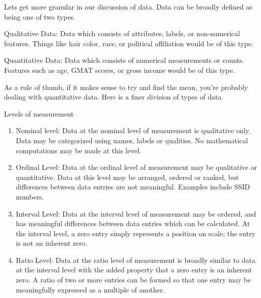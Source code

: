 Lets get more granular in our discussion of data. Data can be broadly defined as being one of two types.

\begin{definition}
Qualitative Data: Data which consists of attributes, labels, or non-numerical features. Things like hair color, race, or political affiliation would be of this type.
\end{definition} 

\begin{definition}
Quantitative Data: Data which consists of numerical measurements or counts. Features such as age, GMAT scores, or gross income would be of this type.
\end{definition} 

As a rule of thumb, if it makes sense to try and find the mean, you're probably dealing with quantitative data. Here is a finer division of types of data.

\begin{theorem}Levels of measurement\newline
\begin{enumerate}

\item Nominal level: Data at the nominal level of measurement is qualitative only. Data may be categorized using names, labels or qualities. No mathematical computations may be made at this level.

\item Ordinal Level: Data at the ordinal level of measurement may be qualitative or quantitative. Data at this level may be arranged, ordered or ranked, but differences between data entries are not meaningful. Examples include SSID numbers.

\item Interval Level: Data at the interval level of measurement may be ordered, and has meaningful differences between data entries which can be calculated. At the interval level, a zero entry simply represents a position on scale; the entry is not an inherent zero.

\item Ratio Level: Data at the ratio level of measurement is broadly similar to data at the interval level with the added property that a zero entry is an inherent zero. A ratio of two or more entries can be formed so that one entry may be meaningfully expressed as a multiple of another.
\end{enumerate}
\end{theorem}

